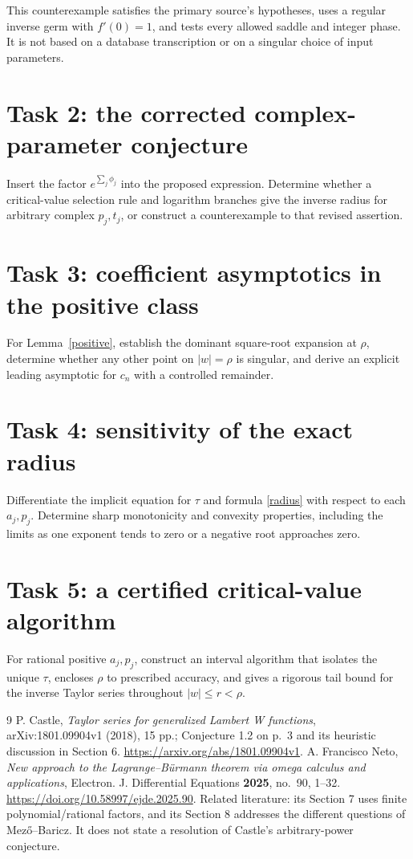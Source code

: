 \documentclass[11pt]{article}
\begin{document}
This counterexample satisfies the primary source's hypotheses,
uses a regular inverse germ with \(f'(0)=1\), and tests every
allowed saddle and integer phase. It is not based on a database
transcription or on a singular choice of input parameters.

\section*{Task 2: the corrected complex-parameter conjecture}
Insert the factor \(e^{\sum_j\phi_j}\) into the proposed expression.
Determine whether a critical-value selection rule and logarithm
branches give the inverse radius for arbitrary complex \(p_j,t_j\),
or construct a counterexample to that revised assertion.

\section*{Task 3: coefficient asymptotics in the positive class}
For Lemma~\ref{positive}, establish the dominant square-root expansion
at \(\rho\), determine whether any other point on \(|w|=\rho\)
is singular, and derive an explicit leading asymptotic for \(c_n\)
with a controlled remainder.

\section*{Task 4: sensitivity of the exact radius}
Differentiate the implicit equation for \(\tau\) and formula
\eqref{radius} with respect to each \(a_j,p_j\). Determine sharp
monotonicity and convexity properties, including the limits as
one exponent tends to zero or a negative root approaches zero.

\section*{Task 5: a certified critical-value algorithm}
For rational positive \(a_j,p_j\), construct an interval algorithm
that isolates the unique \(\tau\), encloses \(\rho\) to prescribed
accuracy, and gives a rigorous tail bound for the inverse Taylor
series throughout \(|w|\le r<\rho\).

\begin{thebibliography}{9}
P. Castle, \emph{Taylor series for generalized Lambert W functions},
arXiv:1801.09904v1 (2018), 15 pp.; Conjecture 1.2 on p.~3
and its heuristic discussion in Section 6.
\url{https://arxiv.org/abs/1801.09904v1}.
A. Francisco Neto,
\emph{New approach to the Lagrange--B\"urmann theorem via omega
calculus and applications},
Electron. J. Differential Equations \textbf{2025}, no.~90, 1--32.
\url{https://doi.org/10.58997/ejde.2025.90}.
Related literature: its Section 7 uses finite polynomial/rational
factors, and its Section 8 addresses the different questions of
Mez\H{o}--Baricz. It does not state a resolution of Castle's
arbitrary-power conjecture.
\end{thebibliography}
\end{document}

